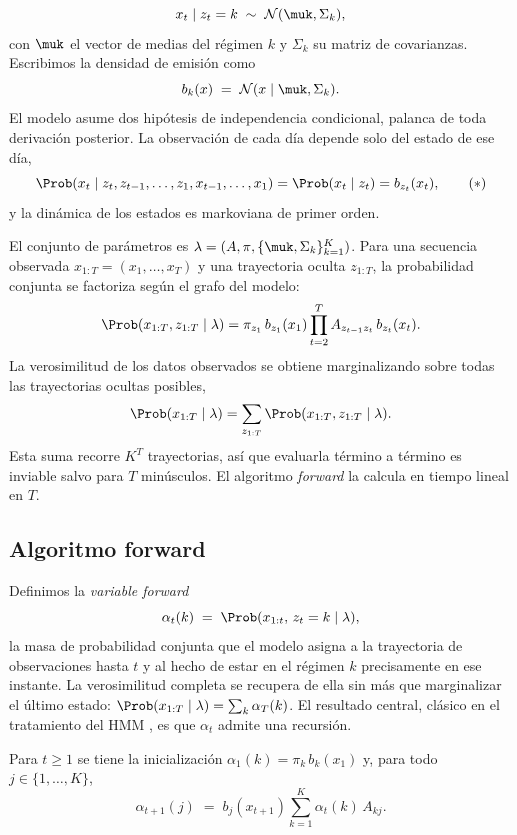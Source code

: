 \[
x_t \mid z_t = k \;\sim\; \mathcal{N}(\muk, \Sigma_k),
\]
con $\muk$ el vector de medias del régimen $k$ y $\Sigma_k$ su matriz de covarianzas. Escribimos la densidad de emisión como
\[
b_k(x) \;=\; \mathcal{N}(x \mid \muk, \Sigma_k).
\]
El modelo asume dos hipótesis de independencia condicional, palanca de toda derivación posterior. La observación de cada día depende solo del estado de ese día,
\[
\Prob(x_t \mid z_t, z_{t-1}, \dots, z_1, x_{t-1}, \dots, x_1) = \Prob(x_t \mid z_t) = b_{z_t}(x_t),
\tag{$\ast$}
\]
y la dinámica de los estados es markoviana de primer orden.

El conjunto de parámetros es $\lambda = (A, \pi, \{\muk, \Sigma_k\}_{k=1}^{K})$. Para una secuencia observada $x_{1:T} = (x_1, \dots, x_T)$ y una trayectoria oculta $z_{1:T}$, la probabilidad conjunta se factoriza según el grafo del modelo:
\[
\Prob(x_{1:T}, z_{1:T} \mid \lambda)
= \pi_{z_1}\, b_{z_1}(x_1) \prod_{t=2}^{T} A_{z_{t-1} z_t}\, b_{z_t}(x_t).
\]
La verosimilitud de los datos observados se obtiene marginalizando sobre todas las trayectorias ocultas posibles,
\[
\Prob(x_{1:T} \mid \lambda) = \sum_{z_{1:T}} \Prob(x_{1:T}, z_{1:T} \mid \lambda).
\]
Esta suma recorre $K^T$ trayectorias, así que evaluarla término a término es inviable salvo para $T$ minúsculos. El algoritmo \emph{forward} la calcula en tiempo lineal en $T$.

\subsection{Algoritmo forward}
\label{sec:hmm-forward}

Definimos la \emph{variable forward}
\[
\alpha_t(k) \;=\; \Prob(x_{1:t},\, z_t = k \mid \lambda),
\]
la masa de probabilidad conjunta que el modelo asigna a la trayectoria de observaciones hasta $t$ y al hecho de estar en el régimen $k$ precisamente en ese instante. La verosimilitud completa se recupera de ella sin más que marginalizar el último estado: $\Prob(x_{1:T} \mid \lambda) = \sum_{k} \alpha_T(k)$. El resultado central, clásico en el tratamiento del HMM \cite{rabiner1989, bishop2006}, es que $\alpha_t$ admite una recursión.

\begin{proposicion}
\label{prop:forward}
Para $t \ge 1$ se tiene la inicialización $\alpha_1(k) = \pi_k\, b_k(x_1)$ y, para todo $j \in \{1, \dots, K\}$,
\[
\alpha_{t+1}(j) \;=\; b_j(x_{t+1}) \sum_{k=1}^{K} \alpha_t(k)\, A_{kj}.
\]
\end{proposicion}

